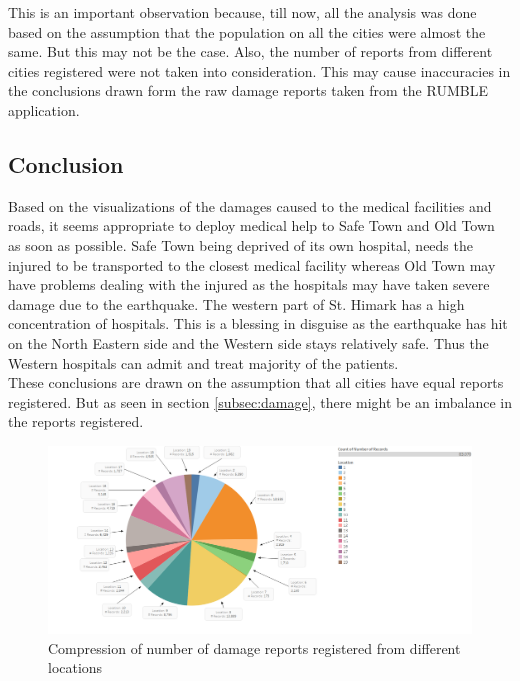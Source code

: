 \documentclass[12pt]{extarticle}
\begin{document}
This is an important observation because, till now, all the analysis was done based on the assumption that the population on all the cities were almost the same. But this may not be the case. Also, the number of reports from different cities registered were not taken into consideration. This may cause inaccuracies in the conclusions drawn form the raw damage reports taken from the RUMBLE application. 

 \newpage
\begin{centering}
	\section{Conclusion}
\end{centering}

Based on the visualizations of the damages caused to the medical facilities and roads, it seems appropriate to deploy medical help to Safe Town and Old Town as soon as possible. Safe Town being deprived of its own hospital, needs the injured to be transported to the closest medical facility whereas Old Town may have problems dealing with the injured as the hospitals may have taken severe damage due to the earthquake. The western part of St. Himark has a high concentration of hospitals. This is a blessing in disguise as the earthquake has hit on the North Eastern side and the Western side stays relatively safe. Thus the Western hospitals can admit and treat majority of the patients. \\

These conclusions are drawn on the assumption that all cities have equal reports registered. But as seen in section \ref{subsec:damage}, there might be an imbalance in the reports registered. 

\begin{figure}[H]
\centering
	\includegraphics[width=\linewidth]{Images/RecordPercentile.png}
	\caption{Compression of number of damage reports registered from different locations}
	\label{fig:regrecords}
\end{figure}
\end{document}
